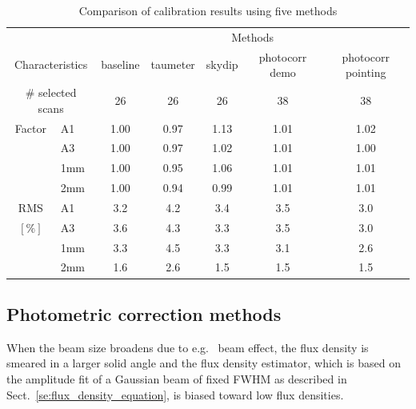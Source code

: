 \begin{table}[!thbp]
\begin{center}
\begin{tabular}{|c|l|c|c|c|c|c|}
  \hline
  \multicolumn{2}{|c|}{}  &  \multicolumn{5}{|c|}{Methods} \\\cline{3-7}
  \multicolumn{2}{|c|}{Characteristics} &  baseline  & taumeter  &  skydip  &  photocorr demo & photocorr pointing \\
  \hline\hline
   \multicolumn{2}{|c|}{$\#$ selected scans} & 26    &       26  &    26    &    38           &    38 \\ 
  \hline 
  Factor &  A1          &   1.00  &  0.97   &  1.13    &   1.01    &   1.02  \\
       &  A3            &   1.00  &  0.97   &  1.02    &   1.01    &   1.00  \\
       &  1mm           &   1.00  &  0.95   &  1.06    &   1.01    &   1.01  \\
       &  2mm           &   1.00  &  0.94   &  0.99    &   1.01    &   1.01  \\
  \hline
  RMS  &  A1            &  3.2    &   4.2   &   3.4    &    3.5    &   3.0 \\
  $[\%]$     &  A3            &  3.6    &   4.3   &   3.3    &    3.5    &   3.0 \\
       &  1mm           &  3.3    &   4.5   &   3.3    &    3.1    &   2.6 \\
       &  2mm           &  1.6    &   2.6   &   1.5    &    1.5    &   1.5 \\
\hline\hline
\end{tabular}
\caption[Comparison of calibration results using five methods]{Comparison of calibration results using five methods}
\label{tab:Abs_calibration_results_all}
\end{center}
\end{table}

\subsection{Photometric correction methods}
\label{se:photocorr_methods}

When the beam size broadens due to e.g. \afternoon\ beam effect, the
flux density is smeared in a larger solid angle and
the flux density estimator, which is based on the amplitude fit of a
Gaussian beam of fixed FWHM as described in
Sect.~\ref{se:flux_density_equation}, is biased toward low flux densities.


